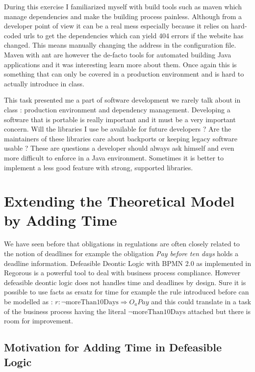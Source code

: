 \documentclass[10pt]{report}
\begin{document}
During this exercise I familiarized myself with build tools such as maven which manage dependencies and make the building process painless. Although from a developer point of view it can be a real mess especially because it relies on hard-coded urls to get the dependencies which can yield 404 errors if the website has changed. This means manually changing the address in the configuration file. Maven with ant are however the de-facto tools for automated building Java applications and it was interesting learn more about them. Once again this is something that can only be covered in a production environment and is hard to actually introduce in class.

This task presented me a part of software development we rarely talk about in class : production environment and dependency management. Developing a software that is portable is really important and it must be a very important concern. Will the libraries I use be available for future developers ? Are the maintainers of these libraries care about backports or keeping legacy software usable ? These are questions a developer should always ask himself and even more difficult to enforce in a Java environment. Sometimes it is better to implement a less good feature with strong, supported libraries.




\section{Extending the Theoretical Model by Adding Time}

We have seen before that obligations in regulations are often closely related to the notion of deadlines for example the obligation \textit{Pay before ten days} holds a deadline information. Defeasible Deontic Logic with BPMN 2.0 as implemented in Regorous is a powerful tool to deal with business process compliance. However defeasible deontic logic does not handles time and deadlines by design. Sure it is possible to use facts as ersatz for time for example the rule introduced before can be modelled as : $r: \neg \text{moreThan10Days} \Rightarrow O_{a}Pay$ and this could translate in a task of the business process having the literal $ \neg \text{moreThan10Days}$ attached but there is room for improvement.

\subsection{Motivation for Adding Time in Defeasible Logic}
\end{document}

